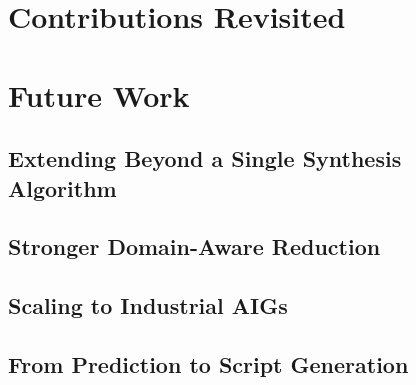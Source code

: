 \section{Contributions Revisited}
\label{sec:conclusion:contributions}


\section{Future Work}
\label{sec:conclusion:futurework}

\subsection{Extending Beyond a Single Synthesis Algorithm}
\label{sec:conclusion:futurework:algorithms}

\subsection{Stronger Domain-Aware Reduction}
\label{sec:conclusion:futurework:domain}

\subsection{Scaling to Industrial AIGs}
\label{sec:conclusion:futurework:scale}

\subsection{From Prediction to Script Generation}
\label{sec:conclusion:futurework:generation}
